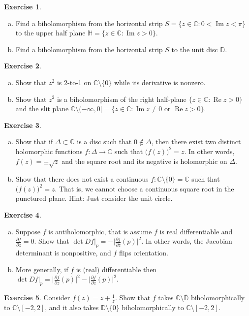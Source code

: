 \documentclass[12pt,openany]{book}
\renewcommand{\Re}{\operatorname{Re}}
\renewcommand{\Im}{\operatorname{Im}}
\newcommand{\babs}[1]{\bigl\lvert {#1} \bigr\rvert}
\newcommand{\C}{{\mathbb{C}}}
\newcommand{\D}{{\mathbb{D}}}
\newcommand{\bH}{{\mathbb{H}}}
\theoremstyle{plain}
\theoremstyle{remark}
\theoremstyle{definition}
\newenvironment{exbox}{%
    \def\FrameCommand{\vrule width 1pt \relax\hspace{10pt}}%
    \MakeFramed{\advance\hsize-\width\FrameRestore}%
}{%
    \endMakeFramed
}
\newenvironment{exparts}{%
    \leavevmode\begin{enumerate}[a),noitemsep,topsep=0pt,parsep=0pt,partopsep=0pt]
}{%
    \end{enumerate}
}
\theoremstyle{exercise}
\newtheorem{exercise}{Exercise}[section]
\theoremstyle{example}
\begin{document}
\begin{exbox}
\begin{exercise}
\begin{exparts}
\item
Find a biholomorphism from the horizontal strip
$S = \{ z \in \C : 0 < \Im z < \pi \}$ to
the upper half plane $\bH = \{ z \in \C : \Im z > 0 \}$.
\item
Find a biholomorphism from the horizontal strip
$S$ to the unit disc $\D$.
\end{exparts}
\end{exercise}

\begin{exercise}
\begin{exparts}
\item
Show that $z^2$ is 2-to-1 on $\C \setminus \{ 0 \}$ while its
derivative is nonzero.
\item
Show that $z^2$ is a biholomorphism of the right half-plane
$\{ z \in \C : \Re z > 0 \}$
and the slit plane $\C \setminus (-\infty,0] = \{ z \in \C : \Im z \not= 0 \text{ or } \Re z > 0 \}$.
\end{exparts}
\end{exercise}

\begin{exercise}
\begin{exparts}
\item
Show that if $\Delta \subset \C$ is a disc such that $0 \notin \Delta$, then
there exist two distinct holomorphic functions $f \colon \Delta \to \C$ such that
${\bigl(f(z)\bigr)}^2 = z$.  In other words, $f(z) = \pm \sqrt{z}$ and the
square root and its negative is holomorphic on $\Delta$.
\item
Show that there does not exist a continuous $f \colon \C \setminus \{ 0 \} =
\C$ such that ${\bigl(f(z)\bigr)}^2 = z$.  That is, we cannot choose a
continuous square root in the punctured plane.  Hint: Just consider the unit
circle.
\end{exparts}
\end{exercise}

\begin{exercise}
\begin{exparts}
\item
Suppose $f$ is antiholomorphic, that is assume $f$ is real differentiable
and $\frac{\partial f}{\partial z} = 0$.  Show that
$\det Df\big|_p = - \babs{\frac{\partial f}{\partial \bar{z}}(p)}^2$.  In other words,
the Jacobian determinant is nonpositive, and $f$ flips orientation.
\item
More generally, if $f$ is (real) differentiable then
$\det Df\big|_p = \babs{\frac{\partial f}{\partial z}(p)}^2 -
\babs{\frac{\partial f}{\partial \bar{z}}(p)}^2$.
\end{exparts}
\end{exercise}

\begin{exercise} \label{exercise:segmentcomplement}
Consider $f(z) = z+ \frac{1}{z}$.  Show that $f$ takes $\C \setminus
\overline{\D}$ biholomorphically to $\C \setminus [-2,2]$, and it also takes
$\D \setminus \{ 0 \}$ biholomorphically to $\C \setminus [-2,2]$.
\end{exercise}
\end{exbox}
\end{document}
